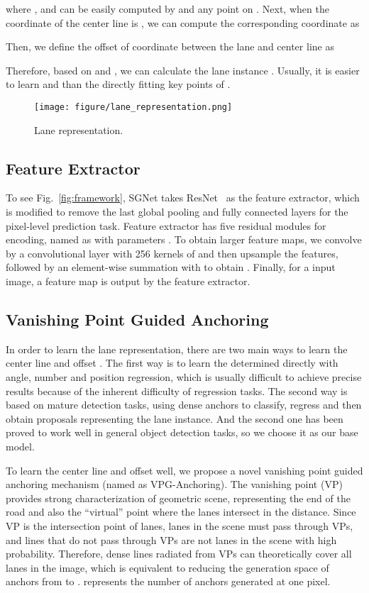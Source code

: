 \documentclass{article}
\begin{document}
where ,  and  can be easily computed by  and any point on . Next, when the  coordinate of the center line is , we can compute the corresponding  coordinate as

Then, we define the offset of  coordinate    between the lane  and center line  as

Therefore, based on  and , we can calculate the lane instance . Usually, it is easier to learn  and  than the directly fitting key points of .

\begin{figure}[t]
\centering
\texttt{[image: figure/lane\_representation.png]}
\caption{Lane representation.}
\label{fig:lane_representation}
\end{figure}

\subsection{Feature Extractor}
To see Fig.~\ref{fig:framework}, SGNet takes ResNet~\cite{he2016deep} as the feature extractor, which is modified to remove the last global pooling and fully connected layers for the pixel-level
prediction task. Feature extractor has five residual modules for encoding, named as  with parameters . To obtain larger feature maps, we convolve  by a convolutional layer with 256 kernels of  and then  upsample the features, followed by an element-wise summation with  to obtain . Finally, for a  input image, a  feature map is output by the feature extractor.

\subsection{Vanishing Point Guided Anchoring}
In order to learn the lane representation, there are two main ways to learn the center line  and  offset . The first way is to learn the determined  directly with angle, number and position regression, which is usually difficult to achieve precise results because of the inherent difficulty of regression tasks. The second way is based on mature detection tasks, using dense anchors to classify,  regress and then obtain proposals representing the lane instance. And the second one has been proved to work well in general object detection tasks, so we choose it as our base model. 

To learn the center line  and  offset  well, we propose a novel vanishing point guided anchoring mechanism (named as VPG-Anchoring). The vanishing point (VP) provides strong characterization of geometric scene, representing the end of the road and also the ``virtual'' point where the lanes intersect in the distance. Since VP is the intersection point of lanes, lanes in the scene must pass through VPs, and lines that do not pass through VPs are not lanes in the scene with high probability. Therefore, dense lines radiated from VPs can theoretically cover all lanes in the image, which is equivalent to reducing the generation space of anchors from  to .  represents the number of anchors generated at one pixel.
\end{document}

